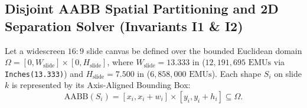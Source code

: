 \documentclass[10pt,journal,compsoc]{IEEEtran}
\begin{document}
\subsection{Disjoint AABB Spatial Partitioning and 2D Separation Solver (Invariants I1 \& I2)}
\label{sec:aabb}
Let a widescreen $16:9$ slide canvas be defined over the bounded Euclidean domain $\Omega = [0, W_{\text{slide}}] \times [0, H_{\text{slide}}]$, where $W_{\text{slide}} = 13.333\text{ in}$ ($12{,}191{,}695\text{ EMUs}$ via \texttt{Inches(13.333)}) and $H_{\text{slide}} = 7.500\text{ in}$ ($6{,}858{,}000\text{ EMUs}$). Each shape $S_i$ on slide $k$ is represented by its Axis-Aligned Bounding Box:
\begin{equation}
    \text{AABB}(S_i) = [x_i, x_i + w_i] \times [y_i, y_i + h_i] \subseteq \Omega.
\end{equation}
\end{document}
